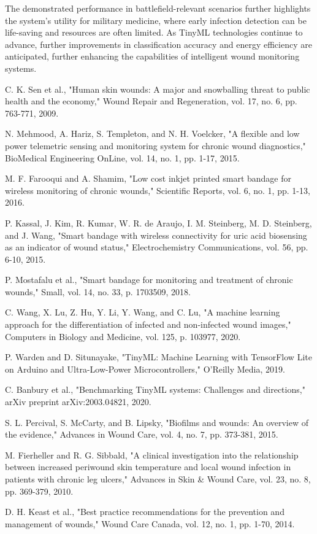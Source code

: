 \documentclass[conference]{IEEEtran}
\begin{document}
The demonstrated performance in battlefield-relevant scenarios further highlights the system's utility for military medicine, where early infection detection can be life-saving and resources are often limited. As TinyML technologies continue to advance, further improvements in classification accuracy and energy efficiency are anticipated, further enhancing the capabilities of intelligent wound monitoring systems.

\begin{thebibliography}{00}
 C. K. Sen et al., "Human skin wounds: A major and snowballing threat to public health and the economy," Wound Repair and Regeneration, vol. 17, no. 6, pp. 763-771, 2009.

 N. Mehmood, A. Hariz, S. Templeton, and N. H. Voelcker, "A flexible and low power telemetric sensing and monitoring system for chronic wound diagnostics," BioMedical Engineering OnLine, vol. 14, no. 1, pp. 1-17, 2015.

 M. F. Farooqui and A. Shamim, "Low cost inkjet printed smart bandage for wireless monitoring of chronic wounds," Scientific Reports, vol. 6, no. 1, pp. 1-13, 2016.

 P. Kassal, J. Kim, R. Kumar, W. R. de Araujo, I. M. Steinberg, M. D. Steinberg, and J. Wang, "Smart bandage with wireless connectivity for uric acid biosensing as an indicator of wound status," Electrochemistry Communications, vol. 56, pp. 6-10, 2015.

 P. Mostafalu et al., "Smart bandage for monitoring and treatment of chronic wounds," Small, vol. 14, no. 33, p. 1703509, 2018.

 C. Wang, X. Lu, Z. Hu, Y. Li, Y. Wang, and C. Lu, "A machine learning approach for the differentiation of infected and non-infected wound images," Computers in Biology and Medicine, vol. 125, p. 103977, 2020.

 P. Warden and D. Situnayake, "TinyML: Machine Learning with TensorFlow Lite on Arduino and Ultra-Low-Power Microcontrollers," O'Reilly Media, 2019.

 C. Banbury et al., "Benchmarking TinyML systems: Challenges and directions," arXiv preprint arXiv:2003.04821, 2020.

 S. L. Percival, S. McCarty, and B. Lipsky, "Biofilms and wounds: An overview of the evidence," Advances in Wound Care, vol. 4, no. 7, pp. 373-381, 2015.

 M. Fierheller and R. G. Sibbald, "A clinical investigation into the relationship between increased periwound skin temperature and local wound infection in patients with chronic leg ulcers," Advances in Skin \& Wound Care, vol. 23, no. 8, pp. 369-379, 2010.

 D. H. Keast et al., "Best practice recommendations for the prevention and management of wounds," Wound Care Canada, vol. 12, no. 1, pp. 1-70, 2014.

\end{thebibliography}
\end{document}
